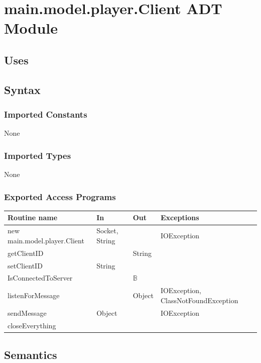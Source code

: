 \documentclass[12pt, titlepage]{article}
\begin{document}
                
        
\section* {main.model.player.Client ADT Module}
    \subsection* {Uses}
    \subsection* {Syntax}
    
        \subsubsection* {Imported Constants}
            None
        \subsubsection* {Imported Types}
            None
        \subsubsection* {Exported Access Programs}
        
        \begin{tabular}{| l | l | l | p{6cm} |}
            \hline
            \textbf{Routine name} & \textbf{In} & \textbf{Out} & \textbf{Exceptions}\\
            \hline
            new main.model.player.Client & Socket, String &  & IOException\\
            \hline
            getClientID &  & String & \\
            \hline 
            setClientID & String &  &\\
            \hline 
            IsConnectedToServer & & $\mathbb{B}$ &\\
            \hline 
            listenForMessage & & Object & IOException, ClassNotFoundException\\
            \hline 
            sendMessage & Object & & IOException\\
            \hline 
            closeEverything &  &  &\\
            \hline
        \end{tabular}
        
    \subsection* {Semantics}
    
\end{document}

